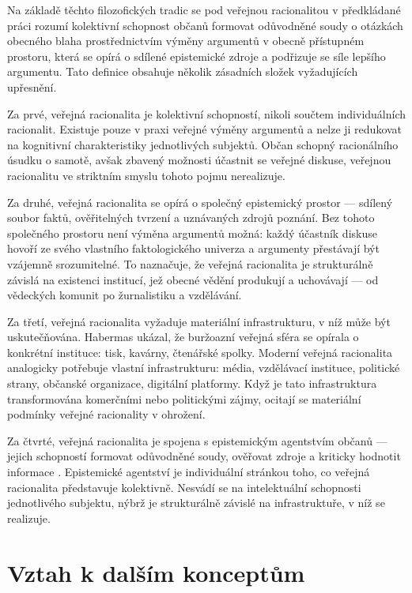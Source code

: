 Na základě těchto filozofických tradic se pod veřejnou racionalitou v předkládané práci rozumí kolektivní schopnost občanů formovat odůvodněné soudy o otázkách obecného blaha prostřednictvím výměny argumentů v obecně přístupném prostoru, která se opírá o sdílené epistemické zdroje a podřizuje se síle lepšího argumentu. Tato definice obsahuje několik zásadních složek vyžadujících upřesnění.

Za prvé, veřejná racionalita je kolektivní schopností, nikoli součtem individuálních racionalit. Existuje pouze v praxi veřejné výměny argumentů a nelze ji redukovat na kognitivní charakteristiky jednotlivých subjektů. Občan schopný racionálního úsudku o samotě, avšak zbavený možnosti účastnit se veřejné diskuse, veřejnou racionalitu ve striktním smyslu tohoto pojmu nerealizuje.

Za druhé, veřejná racionalita se opírá o společný epistemický prostor — sdílený soubor faktů, ověřitelných tvrzení a uznávaných zdrojů poznání. Bez tohoto společného prostoru není výměna argumentů možná: každý účastník diskuse hovoří ze svého vlastního faktologického univerza a argumenty přestávají být vzájemně srozumitelné. To naznačuje, že veřejná racionalita je strukturálně závislá na existenci institucí, jež obecné vědění produkují a uchovávají — od vědeckých komunit po žurnalistiku a vzdělávání.

Za třetí, veřejná racionalita vyžaduje materiální infrastrukturu, v níž může být uskutečňována. Habermas ukázal, že buržoazní veřejná sféra se opírala o konkrétní instituce: tisk, kavárny, čtenářské spolky. Moderní veřejná racionalita analogicky potřebuje vlastní infrastrukturu: média, vzdělávací instituce, politické strany, občanské organizace, digitální platformy. Když je tato infrastruktura transformována komerčními nebo politickými zájmy, ocitají se materiální podmínky veřejné racionality v ohrožení.

Za čtvrté, veřejná racionalita je spojena s epistemickým agentstvím občanů — jejich schopností formovat odůvodněné soudy, ověřovat zdroje a kriticky hodnotit informace \parencite{Coeckelbergh23}. Epistemické agentství je individuální stránkou toho, co veřejná racionalita představuje kolektivně. Nesvádí se na intelektuální schopnosti jednotlivého subjektu, nýbrž je strukturálně závislé na infrastruktuře, v níž se realizuje.

\section{Vztah k dalším konceptům}

